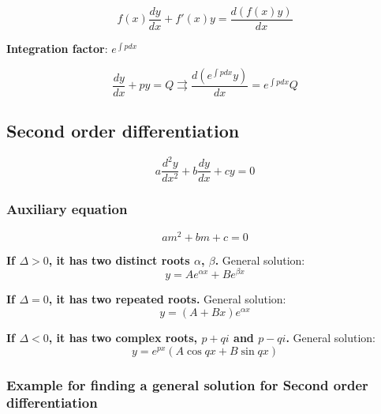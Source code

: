 \documentclass[a4paper,9pt]{scrartcl}
\begin{document}
    \begin{displaymath}
        f(x) \frac{dy}{dx} + f'(x) y = \frac{d(f(x) y )}{dx}
    \end{displaymath}

    \textbf{Integration factor}: $\boxed{e^{\int{p}dx}}$

    \begin{displaymath}
        \frac{dy}{dx}+py=Q \rightrightarrows \frac{d(\boxed{e^{\int{p}dx}}y)}{dx} = \boxed{e^{\int{p}dx}} Q
    \end{displaymath}

    \subsection{Second order differentiation}

    \begin{displaymath}
        a\frac{d^{2}y}{dx^2} + b\frac{dy}{dx} + cy = 0
    \end{displaymath}

    \subsubsection{Auxiliary equation}
    \begin{displaymath}
        am^2 + bm + c = 0
    \end{displaymath}

    \textbf{If $\Delta > 0$, it has two distinct roots $\alpha$, $\beta$.}
    General solution:
    \begin{displaymath}
        y = Ae^{{\alpha}x} + Be^{{\beta}x}
    \end{displaymath}

    \textbf{If $\Delta = 0$, it has two repeated roots.}
    General solution:
    \begin{displaymath}
        y = (A+Bx)e^{{\alpha}x}
    \end{displaymath}

    \textbf{If $\Delta < 0$, it has two complex roots, $p + qi$ and $p - qi$. }
    General solution:
    \begin{displaymath}
        y = e^{px}(A\cos{qx}+B\sin{qx})
    \end{displaymath}

    \subsubsection{Example for finding a general solution for Second order differentiation}
\end{document}
